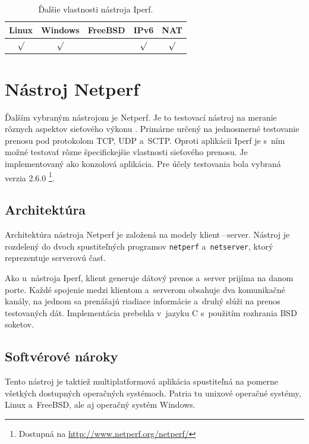         \begin{table}[H]
            \begin{center}
                \begin{tabular}{|c|c|c|c|c|} 
                    \hline
                    \textbf{Linux}  &  \textbf{Windows}  &
                    \textbf{FreeBSD} & \textbf{IPv6} &
                    \textbf{NAT} \\
                    \hline
                    $\surd$ & $\surd$ &  & $\surd$ & $\surd$ \\ 
                    \hline
                \end{tabular}
                \caption{Ďalšie vlastnosti nástroja Iperf.}
                \label{tab_iperf_vlast}
            \end{center}
        \end{table}

  \section{Nástroj Netperf} \label{netperf}
    Ďalším vybraným nástrojom je Netperf. Je to testovací nástroj na meranie 
    rôznych aspektov sieťového výkonu \cite{netperf_manual}.
    Primárne určený na jednosmerné testovanie prenosu pod protokolom TCP, UDP
    a~SCTP. Oproti aplikácii Iperf je s~ním možné testovať rôzne špecifickejšie 
    vlastnosti sieťového prenosu.
    Je implementovaný ako konzolová aplikácia.
    Pre účely testovania bola vybraná verzia 2.6.0
    \footnote{Dostupná na \url{http://www.netperf.org/netperf/}}.

        \subsection{Architektúra}\label{netperf_arch}
        Architektúra nástroja Netperf je založená na modely klient\,--\,server.
        Nástroj je rozdelený do dvoch spustiteľných programov \texttt{netperf}
        a~\texttt{netserver}, ktorý reprezentuje serverovú časť.

        Ako u~nástroja Iperf, klient generuje dátový prenos a~server 
        prijíma na danom porte. Každé spojenie medzi klientom
        a~serverom obsahuje dva komunikačné kanály, na jednom sa 
        prenášajú riadiace informácie a~druhý slúži na
        prenos testovaných dát.
        Implementácia prebehla v~jazyku C s~použitím rozhrania BSD soketov.

        \subsection{Softvérové nároky} \label{netperf_sw}
        Tento nástroj je taktiež multiplatformová aplikácia spustiteľná na
        pomerne všetkých dostupných operačných systémoch. Patria tu unixové
        operačné systémy, Linux a~FreeBSD, ale aj operačný systém Windows.

